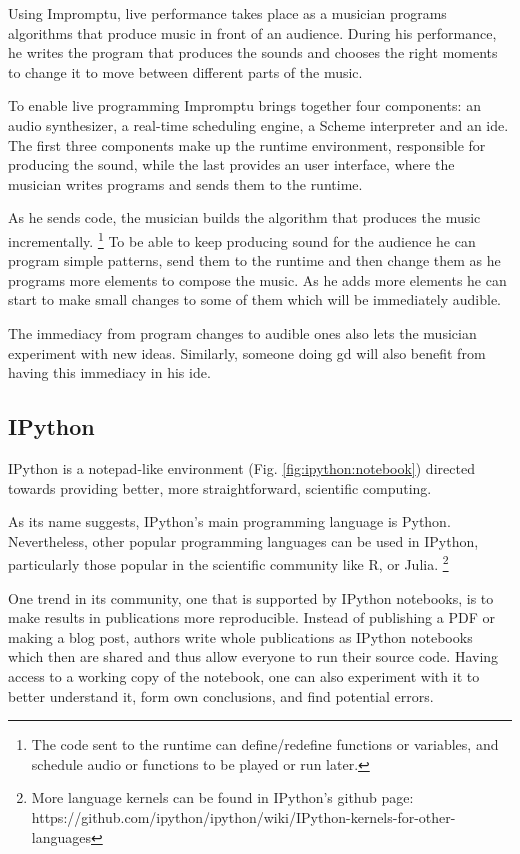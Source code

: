 Using Impromptu, live performance takes place as a musician programs algorithms that produce music in front of an audience.
During his performance, he writes the program that produces the sounds and chooses the right moments to change it to move between different parts of the music.

To enable live programming Impromptu brings together four components: an audio synthesizer, a real-time scheduling engine, a Scheme interpreter and an \gls{ide}.
The first three components make up the runtime environment, responsible for producing the sound, while the last provides an user interface, where the musician writes programs and sends them to the runtime.

As he sends code, the musician builds the algorithm that produces the music incrementally.%
\footnote{The code sent to the runtime can define/redefine functions or variables, and schedule audio or functions to be played or run later.}
To be able to keep producing sound for the audience he can program simple patterns, send them to the runtime and then change them as he programs more elements to compose the music.
As he adds more elements he can start to make small changes to some of them which will be immediately audible.

The immediacy from program changes to audible ones also lets the musician experiment with new ideas.
Similarly, someone doing \gls{gd} will also benefit from having this immediacy in his \gls{ide}.


\subsection{IPython}
\label{section:ipython:related}
IPython\cite{PER-GRA:2007} is a notepad-like environment (Fig. \ref{fig:ipython:notebook}) directed towards providing better, more straightforward, scientific computing.

As its name suggests, IPython's main programming language is Python.
Nevertheless, other popular programming languages can be used in IPython, particularly those popular in the scientific community like R, or Julia.%
\footnote{More language kernels can be found in IPython's github page: https://github.com/ipython/ipython/wiki/IPython-kernels-for-other-languages}

One trend in its community, one that is supported by IPython notebooks, is to make results in publications more reproducible.
Instead of publishing a PDF or making a blog post, authors write whole publications as IPython notebooks which then are shared and thus allow everyone to run their source code.
Having access to a working copy of the notebook, one can also experiment with it to better understand it, form own conclusions, and find potential errors.

